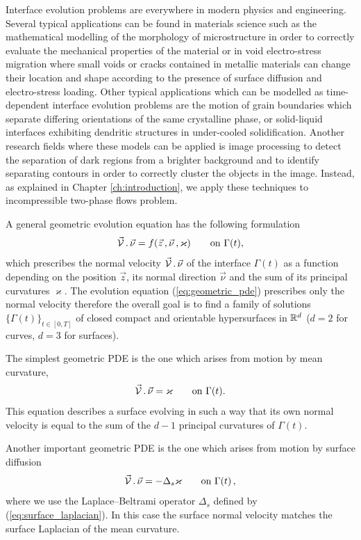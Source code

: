 Interface evolution problems are everywhere in modern physics and engineering.
Several typical applications can be found in materials science such as the
mathematical modelling of the morphology of microstructure in order to
correctly evaluate the mechanical properties of the material or in void
electro-stress migration where small voids or cracks contained in metallic
materials can change their location and shape according to the presence of
surface diffusion and electro-stress loading. Other typical applications which
can be modelled as time-dependent interface evolution problems are the motion of
grain boundaries which separate differing orientations of the same crystalline
phase, or solid-liquid interfaces exhibiting dendritic structures in
under-cooled solidification. Another research fields where these models can be
applied is image processing to detect the separation of dark regions from a
brighter background and to identify separating contours in order to correctly
cluster the objects in the image. Instead, as explained in Chapter
\ref{ch:introduction}, we apply these techniques to incompressible two-phase
flows problem.

A general geometric evolution equation has the following formulation
\begin{equation}\label{eq:geometric_pde}
\vec{\mathcal{V}}\,.\,\vec\nu=f(\vec{z}\,,\vec{\nu}\,,\varkappa)
\qquad\mbox{on }\Gamma(t),
\end{equation}
which prescribes the normal velocity $\vec{\mathcal{V}}\,.\,\vec\nu$ of the
interface $\Gamma(t)$ as a function depending on the position $\vec z$, its
normal direction $\vec{\nu}$ and the sum of its principal curvatures
$\varkappa$. The evolution equation (\ref{eq:geometric_pde}) prescribes only
the normal velocity therefore the overall goal is to find a family of
solutions $\{ \Gamma(t) \}_{t \in [0, T]}$ of closed compact and orientable
hypersurfaces in ${\mathbb R}^{d}$ ($d = 2$ for curves, $d = 3$ for surfaces).

The simplest geometric PDE is the one which arises from motion by mean
curvature,
\begin{equation}\label{eq:mean_curvature}
\vec{\mathcal{V}}\,.\,\vec\nu=\varkappa\qquad\mbox{on }\Gamma(t).
\end{equation}
This equation describes a surface evolving in such a way that its own normal
velocity is equal to the sum of the $d-1$ principal curvatures of $\Gamma(t)$.

Another important geometric PDE is the one which arises from motion by
surface diffusion
\begin{equation}\label{eq:surface_diff}
\vec{\mathcal{V}}\,.\,\vec\nu=-\Delta_s \varkappa \qquad\mbox{on }\Gamma(t)\,,
\end{equation}
where we use the Laplace--Beltrami operator $\Delta_s$ defined by
(\ref{eq:surface_laplacian}). In this case the surface normal velocity matches
the surface Laplacian of the mean curvature.

